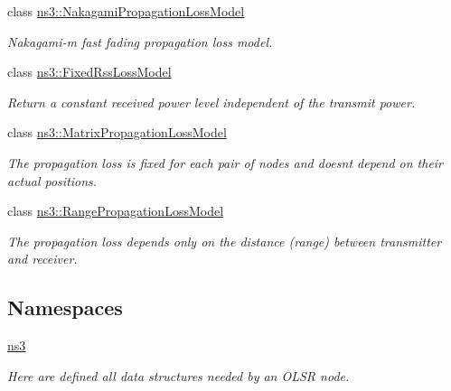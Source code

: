 \begin{DoxyCompactItemize}
class \hyperlink{classns3_1_1NakagamiPropagationLossModel}{ns3\+::\+Nakagami\+Propagation\+Loss\+Model}
\begin{DoxyCompactList}\small\item\em Nakagami-\/m fast fading propagation loss model. \end{DoxyCompactList}\item 
class \hyperlink{classns3_1_1FixedRssLossModel}{ns3\+::\+Fixed\+Rss\+Loss\+Model}
\begin{DoxyCompactList}\small\item\em Return a constant received power level independent of the transmit power. \end{DoxyCompactList}\item 
class \hyperlink{classns3_1_1MatrixPropagationLossModel}{ns3\+::\+Matrix\+Propagation\+Loss\+Model}
\begin{DoxyCompactList}\small\item\em The propagation loss is fixed for each pair of nodes and doesn\textquotesingle{}t depend on their actual positions. \end{DoxyCompactList}\item 
class \hyperlink{classns3_1_1RangePropagationLossModel}{ns3\+::\+Range\+Propagation\+Loss\+Model}
\begin{DoxyCompactList}\small\item\em The propagation loss depends only on the distance (range) between transmitter and receiver. \end{DoxyCompactList}\end{DoxyCompactItemize}
\subsection*{Namespaces}
\begin{DoxyCompactItemize}
\item 
 \hyperlink{namespacens3}{ns3}
\begin{DoxyCompactList}\small\item\em Here are defined all data structures needed by an O\+L\+SR node. \end{DoxyCompactList}\end{DoxyCompactItemize}
